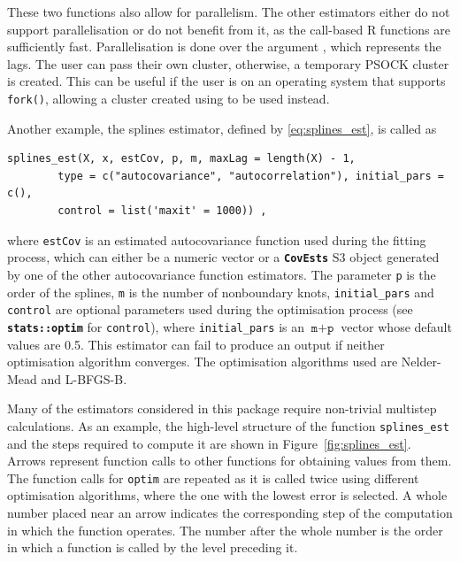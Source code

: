 These two functions also allow for parallelism. The other estimators
either do not support parallelisation or do not benefit from it, as the
call-based R functions are sufficiently fast. Parallelisation is done
over the argument , which represents the lags. The user can pass
their own cluster, otherwise, a temporary PSOCK cluster is created. This
can be useful if the user is on an operating system that supports
\texttt{fork()}, allowing a cluster created using
 to be used instead.

Another example, the splines estimator, defined by
\eqref{eq:splines_est}, is called as

\begin{verbatim}
splines_est(X, x, estCov, p, m, maxLag = length(X) - 1,
        type = c("autocovariance", "autocorrelation"), initial_pars = c(),
        control = list('maxit' = 1000)) ,
\end{verbatim}

where \texttt{estCov} is an estimated autocovariance function used
during the fitting process, which can either be a numeric vector or a
\textbf{\texttt{CovEsts}} S3 object generated by one of the other
autocovariance function estimators. The parameter \texttt{p} is the
order of the splines, \texttt{m} is the number of nonboundary knots,
\texttt{initial\_pars} and \texttt{control} are optional parameters used
during the optimisation process (see \textbf{\texttt{stats::optim}} for
\texttt{control}), where \texttt{initial\_pars} is an
\(\texttt{m} + \texttt{p}\) vector whose default values are 0.5. This
estimator can fail to produce an output if neither optimisation
algorithm converges. The optimisation algorithms used are Nelder-Mead
and L-BFGS-B.

Many of the estimators considered in this package require non-trivial
multistep calculations. As an example, the high-level structure of the
function \texttt{splines\_est} and the steps required to compute it are
shown in Figure~\ref{fig:splines_est}. Arrows represent function calls
to other functions for obtaining values from them. The function calls
for \texttt{optim} are repeated as it is called twice using different
optimisation algorithms, where the one with the lowest error is
selected. A whole number placed near an arrow indicates the
corresponding step of the computation in which the function operates.
The number after the whole number is the order in which a function is
called by the level preceding it.

